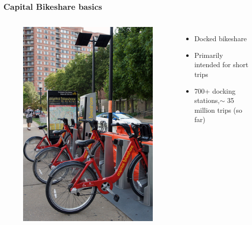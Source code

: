 \documentclass{beamer}
\begin{document}
\begin{frame}
    \frametitle{Capital Bikeshare basics}
    \begin{columns}
        \begin{figure}
            \includegraphics[]{800px-VA_07_2012_Capital_Bikeshare_4152.JPG}
        \end{figure}
        \begin{itemize}
            \item Docked bikeshare
            \item Primarily intended for short trips
            \item 700+ docking stations,$\sim$ 35 million trips (so far)
        \end{itemize}


\end{columns}
\end{frame}
\end{document}
